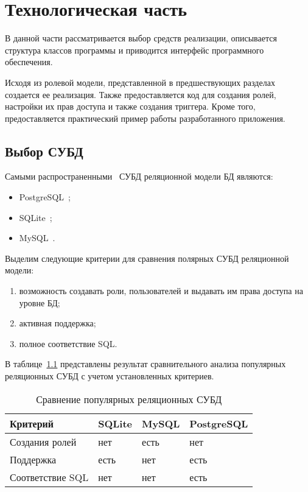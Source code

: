 \chapter{Технологическая часть}
В данной части рассматривается выбор средств реализации, описывается структура классов программы и приводится интерфейс программного обеспечения.

Исходя из ролевой модели, представленной в предшествующих разделах создается ее реализация. 
Также предоставляется код для создания ролей, настройки их прав доступа и также создания триггера. 
Кроме того, предоставляется практический пример работы разработанного приложения.

\section{Выбор СУБД}

Самыми распространенными~\cite{sql-popular} СУБД реляционной модели БД являются:
\begin{itemize}
	\item PostgreSQL~\cite{postsql-db, sql-df};
	\item SQLite~\cite{sql-df};
	\item MySQL~\cite{sql-df}.
\end{itemize}

Выделим следующие критерии для сравнения полярных СУБД реляционной модели:
\begin{enumerate}
	\item возможность создавать роли, пользователей и выдавать им права доступа на уровне БД;
	\item активная поддержка;
	\item полное соответствие SQL.
\end{enumerate} 

В таблице~\ref{tbl:compare_DBMS} представлены результат сравнительного анализа популярных реляционных СУБД с учетом установленных критериев.

\begin{table}[ht!]
	\centering
	\caption{Сравнение популярных реляционных СУБД}
	\label{tbl:compare_DBMS}
	\begin{tabular}{|l|l|l|l|}
		\hline
		\textbf{Критерий} & \textbf{SQLite}& \textbf{MySQL} & \textbf{PostgreSQL}  \\ \hline
		
		Создания ролей & нет & есть & нет \\ \hline
		Поддержка & есть & нет & есть \\ \hline
		Соответствие SQL & нет & нет & есть  \\ \hline
		
	\end{tabular}
\end{table}


